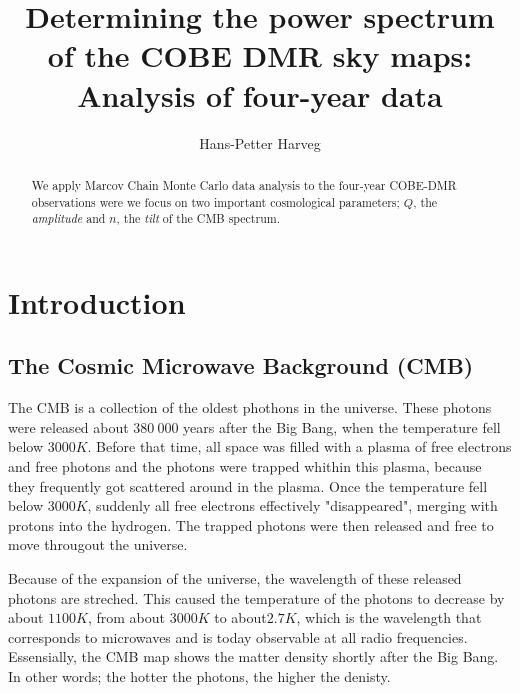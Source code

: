 \documentclass{emulateapj}
\begin{document}
\title{Determining the power spectrum of the COBE DMR sky maps: Analysis of four-year data}

\author{Hans-Petter Harveg}




\begin{abstract}
  We apply Marcov Chain Monte Carlo data analysis to the four-year COBE-DMR observations were we focus on two important cosmological parameters; $Q$, the \textit{amplitude} and $n$, the \textit{tilt} of the CMB spectrum.
\end{abstract}

\section{Introduction}
\label{sec:introduction}

\subsection{The Cosmic Microwave Background (CMB)}
\label{subsec:cmb_description}
  The CMB is a collection of the oldest phothons in the universe. These photons were released about $380 \ 000$ years after the Big Bang, when the temperature fell below $3000K$. Before that time, all space was filled with a plasma of free electrons and free photons and the photons were trapped whithin this plasma, because they frequently got scattered around in the plasma. Once the temperature fell below $3000K$, suddenly all free electrons effectively "disappeared", merging with protons into the hydrogen. The trapped photons were then released and free to move througout the universe.

  Because of the expansion of the universe, the wavelength of these released photons are streched. This caused the temperature of the photons to decrease by about $1100K$, from about $3000K$ to about$2.7K$, which is the wavelength that corresponds to microwaves and is today observable at all radio frequencies. Essensially, the CMB map shows the matter density shortly after the Big Bang. In other words; the hotter the photons, the higher the denisty.
\end{document}
